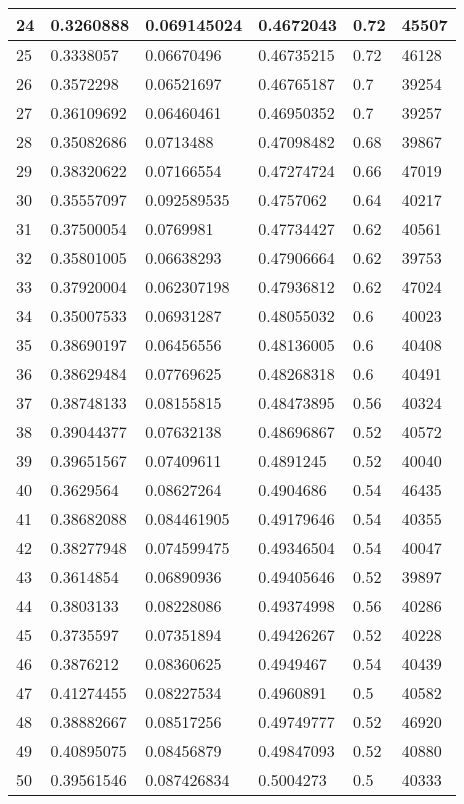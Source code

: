 \begin{longtable}{|l|l|l|l|l|l|}
24 & 0.3260888 & 0.069145024 & 0.4672043 & 0.72 & 45507 \\ \hline 
25 & 0.3338057 & 0.06670496 & 0.46735215 & 0.72 & 46128 \\ \hline 
26 & 0.3572298 & 0.06521697 & 0.46765187 & 0.7 & 39254 \\ \hline 
27 & 0.36109692 & 0.06460461 & 0.46950352 & 0.7 & 39257 \\ \hline 
28 & 0.35082686 & 0.0713488 & 0.47098482 & 0.68 & 39867 \\ \hline 
29 & 0.38320622 & 0.07166554 & 0.47274724 & 0.66 & 47019 \\ \hline 
30 & 0.35557097 & 0.092589535 & 0.4757062 & 0.64 & 40217 \\ \hline 
31 & 0.37500054 & 0.0769981 & 0.47734427 & 0.62 & 40561 \\ \hline 
32 & 0.35801005 & 0.06638293 & 0.47906664 & 0.62 & 39753 \\ \hline 
33 & 0.37920004 & 0.062307198 & 0.47936812 & 0.62 & 47024 \\ \hline 
34 & 0.35007533 & 0.06931287 & 0.48055032 & 0.6 & 40023 \\ \hline 
35 & 0.38690197 & 0.06456556 & 0.48136005 & 0.6 & 40408 \\ \hline 
36 & 0.38629484 & 0.07769625 & 0.48268318 & 0.6 & 40491 \\ \hline 
37 & 0.38748133 & 0.08155815 & 0.48473895 & 0.56 & 40324 \\ \hline 
38 & 0.39044377 & 0.07632138 & 0.48696867 & 0.52 & 40572 \\ \hline 
39 & 0.39651567 & 0.07409611 & 0.4891245 & 0.52 & 40040 \\ \hline 
40 & 0.3629564 & 0.08627264 & 0.4904686 & 0.54 & 46435 \\ \hline 
41 & 0.38682088 & 0.084461905 & 0.49179646 & 0.54 & 40355 \\ \hline 
42 & 0.38277948 & 0.074599475 & 0.49346504 & 0.54 & 40047 \\ \hline 
43 & 0.3614854 & 0.06890936 & 0.49405646 & 0.52 & 39897 \\ \hline 
44 & 0.3803133 & 0.08228086 & 0.49374998 & 0.56 & 40286 \\ \hline 
45 & 0.3735597 & 0.07351894 & 0.49426267 & 0.52 & 40228 \\ \hline 
46 & 0.3876212 & 0.08360625 & 0.4949467 & 0.54 & 40439 \\ \hline 
47 & 0.41274455 & 0.08227534 & 0.4960891 & 0.5 & 40582 \\ \hline 
48 & 0.38882667 & 0.08517256 & 0.49749777 & 0.52 & 46920 \\ \hline 
49 & 0.40895075 & 0.08456879 & 0.49847093 & 0.52 & 40880 \\ \hline 
50 & 0.39561546 & 0.087426834 & 0.5004273 & 0.5 & 40333 \\ \hline 
\end{longtable}